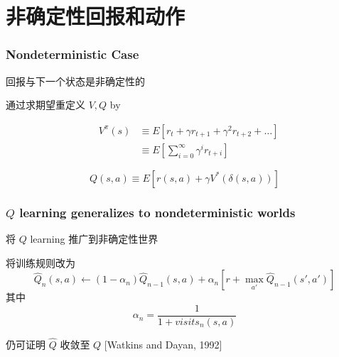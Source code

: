 \documentclass{beamer}
\begin{document}
\section{非确定性回报和动作}
\label{sec-4}
\begin{frame}
\frametitle{Nondeterministic Case}
\label{sec-4-1}


回报与下一个状态是非确定性的

通过求期望重定义 $V, Q$ by

\begin{eqnarray}
 & V^{\pi}(s) & \equiv E[ r_{t} + \gamma r_{t+1} + \gamma^{2} r_{t+2} + \ldots ] \nonumber \\ 
& & \equiv E [ \sum_{i=0}^{\infty} \gamma^{i} r_{t+i} ] \nonumber
\end{eqnarray}

\[Q(s,a) \equiv E[r(s,a) + \gamma V^{*}(\delta(s,a))]\]
\end{frame}
\begin{frame}
\frametitle{$Q$ learning generalizes to nondeterministic worlds}
\label{sec-4-2}


将 $Q$ learning 推广到非确定性世界

将训练规则改为
\[\hat{Q}_{n}(s,a)  \leftarrow  (1-\alpha_{n})\hat{Q}_{n-1}(s,a) + \alpha_{n}[r + \max_{a'}\hat{Q}_{n-1}(s',a')]\]
其中
\[\alpha_{n} = \frac{1}{1 + visits_n(s,a)}\]

仍可证明 $\hat{Q}$ 收敛至 $Q$ [Watkins and Dayan, 1992]
\end{frame}
\end{document}
